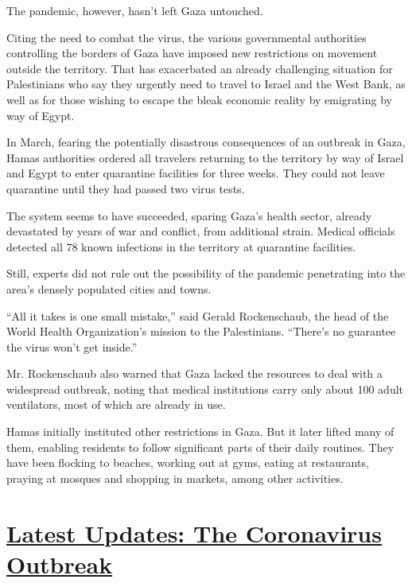 The pandemic, however, hasn't left Gaza untouched.

Citing the need to combat the virus, the various governmental
authorities controlling the borders of Gaza have imposed new
restrictions on movement outside the territory. That has exacerbated an
already challenging situation for Palestinians who say they urgently
need to travel to Israel and the West Bank, as well as for those wishing
to escape the bleak economic reality by emigrating by way of Egypt.

In March, fearing the potentially disastrous consequences of an outbreak
in Gaza, Hamas authorities ordered all travelers returning to the
territory by way of Israel and Egypt to enter quarantine facilities for
three weeks. They could not leave quarantine until they had passed two
virus tests.

The system seems to have succeeded, sparing Gaza's health sector,
already devastated by years of war and conflict, from additional strain.
Medical officials detected all 78 known infections in the territory at
quarantine facilities.

Still, experts did not rule out the possibility of the pandemic
penetrating into the area's densely populated cities and towns.

``All it takes is one small mistake,'' said Gerald Rockenschaub, the
head of the World Health Organization's mission to the Palestinians.
``There's no guarantee the virus won't get inside.''

Mr. Rockenschaub also warned that Gaza lacked the resources to deal with
a widespread outbreak, noting that medical institutions carry only about
100 adult ventilators, most of which are already in use.

Hamas initially instituted other restrictions in Gaza. But it later
lifted many of them, enabling residents to follow significant parts of
their daily routines. They have been flocking to beaches, working out at
gyms, eating at restaurants, praying at mosques and shopping in markets,
among other activities.

\hypertarget{latest-updates-the-coronavirus-outbreak}{%
\section{\texorpdfstring{\href{https://www.nytimes.com/2020/08/07/world/covid-19-news.html?action=click\&pgtype=Article\&state=default\&region=MAIN_CONTENT_1\&context=storylines_live_updates}{Latest
Updates: The Coronavirus
Outbreak}}{Latest Updates: The Coronavirus Outbreak}}\label{latest-updates-the-coronavirus-outbreak}}

